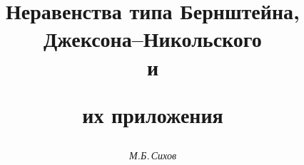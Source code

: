 




%





\newcommand{\sign}{\operatorname{sign}}


\newcommand{\tts}[1]{}







\setcounter{page}{57}















\author{\it М.Б.\,Сихов}




\title{Неравенства типа Бернштейна, Джексона--Никольского\\ и 


их приложения}





\date{}




\pagestyle{plain} %







\maketitle


\label{begin}





